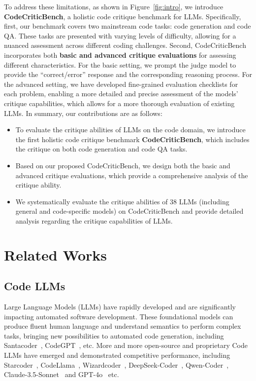 \documentclass[11pt, a4paper, logo, copyright, nonumbering, amsart]{map}
\begin{document}
\begin{CJK*}{UTF8}{gbsn}
To address these limitations, as shown in Figure~\ref{fig:intro}, we introduce \textbf{CodeCriticBench}, a holistic code critique benchmark for LLMs. Specifically, first, our benchmark covers two mainstream code tasks: code generation and code QA. These tasks are presented with varying levels of difficulty, allowing for a nuanced assessment across different coding challenges. Second, CodeCriticBench incorporates both \textbf{basic and advanced critique evaluations} for assessing different characteristics. For the basic setting, we prompt the judge model to provide the ``correct/error'' response and the corresponding reasoning process. For the advanced setting, we have developed fine-grained evaluation checklists for each problem, enabling a more detailed and precise assessment of the models' critique capabilities, which allows for a more thorough evaluation of existing LLMs. In summary, our contributions are as follows:

\begin{itemize}

\item To evaluate the critique abilities of LLMs on the code domain, we introduce the first holistic code critique benchmark \textbf{CodeCriticBench}, which includes the critique on both code generation and code QA tasks.

\item Based on our proposed CodeCriticBench, we design both the basic and advanced critique evaluations, which provide a comprehensive analysis of the critique ability.

\item We systematically evaluate the critique abilities of 38 LLMs (including general and code-specific models) on CodeCriticBench and provide detailed analysis regarding the critique capabilities of LLMs.

\end{itemize}

\section{Related Works}

\subsection{Code LLMs} 

Large Language Models (LLMs) have rapidly developed and are significantly impacting automated software development. These foundational models can produce fluent human language and understand semantics to perform complex tasks, bringing new possibilities to automated code generation, including Santacoder~\cite{allal2023santacoder}, CodeGPT~\cite{lu2021codexglue}, etc. More and more open-source and proprietary Code LLMs have emerged and demonstrated competitive performance, including Starcoder~\cite{li2023starcoder}, CodeLlama~\cite{roziere2023code}, Wizardcoder~\cite{luo2023wizardcoder}, DeepSeek-Coder~\cite{guo2024deepseek}, Qwen-Coder~\cite{hui2024qwen2}, Claude-3.5-Sonnet~\cite{claude_2024} and GPT-4o~\cite{gpt_4o} etc. 


\end{CJK*}
\end{document}
